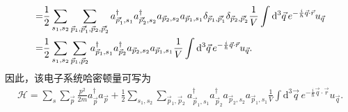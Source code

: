 \documentclass{assignment}
\begin{document}
\begin{pf}
\begin{align}
        \notag=&\frac{1}{2}\sum_{s_1,s_2}\sum_{\vec{p}_1,\vec{p}_1',\vec{p}_2,\vec{p}_2'}a_{\vec{p}_1',s_1}^{\dagger}a_{\vec{p}_2',s_2}^{\dagger}a_{\vec{p}_2,s_2}a_{\vec{p}_1,s_1}\delta_{\vec{p}_1,\vec{p}_1'}\delta_{\vec{p}_2,\vec{p}_2'}\frac{1}{V}\int\mathrm{d}^3\vec{q}\,e^{-\frac{i}{\hbar}\vec{q}\cdot\vec{r}}u_{\vec{q}}\\
        =&\frac{1}{2}\sum_{s_1,s_2}\sum_{\vec{p}_1,\vec{p}_2}a_{\vec{p}_1,s_1}^{\dagger}a_{\vec{p}_2}^{\dagger}a_{\vec{p}_2,s_2}a_{\vec{p}_1,s_1}\frac{1}{V}\int\mathrm{d}^3\vec{q}\,e^{-\frac{i}{\hbar}\vec{q}\cdot\vec{r}}u_{\vec{q}}.
    \end{align}
    因此，该电子系统哈密顿量可写为
    \begin{align}
        \mathcal{H}=\sum_s\sum_{\vec{p}}\frac{p^2}{2m}a_{\vec{p}}^{\dagger}a_{\vec{p}}+\frac{1}{2}\sum_{s_1,s_2}\sum_{\vec{p}_1,\vec{p}_2}a_{\vec{p}_1,s_1}^{\dagger}a_{\vec{p}_2}^{\dagger}a_{\vec{p}_2,s_2}a_{\vec{p}_1,s_1}\frac{1}{V}\int\mathrm{d}^3\vec{q}\,e^{-\frac{i}{\hbar}\vec{q}\cdot\vec{r}}u_{\vec{q}}.
    \end{align}
\end{pf}
\end{document}
